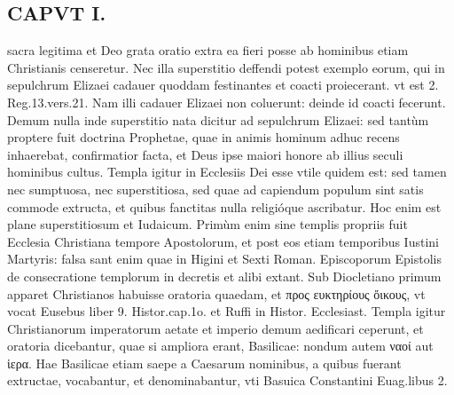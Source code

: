 \documentclass{article}
\begin{document}
\begin{pages}
\section*{CAPVT I. }
\marginpar{[ p.71 ]}\pstart sacra legitima et Deo grata oratio extra ea fieri posse ab hominibus etiam Christianis censeretur.  \pend\pstart Nec illa superstitio deffendi potest exemplo eorum, qui in sepulchrum Elizaei cadauer quoddam festinantes et coacti proiecerant. vt est 2. Reg.13.vers.21. Nam illi cadauer Elizaei non coluerunt: deinde id coacti fecerunt. Demum nulla inde superstitio nata dicitur ad sepulchrum Elizaei: sed tantùm proptere fuit doctrina Prophetae, quae in animis hominum adhuc recens inhaerebat, confirmatior facta, et Deus ipse maiori honore ab illius seculi hominibus cultus.  \pend\pstart Templa igitur in Ecclesiis Dei esse vtile quidem est: sed tamen nec sumptuosa, nec superstitiosa, sed quae ad capiendum populum sint satis commode extructa, et quibus fanctitas nulla religióque ascribatur. Hoc enim est plane superstitiosum et Iudaicum. Primùm enim sine templis propriis fuit Ecclesia Christiana tempore Apostolorum, et post eos etiam temporibus Iustini Martyris: falsa sant enim quae in Higini et Sexti Roman. Episcoporum Epistolis de consecratione templorum in decretis et alibi extant. Sub Diocletiano primum apparet Christianos habuisse oratoria quaedam, et προς ευκτηρίους  ὄικους, vt vocat Eusebus liber 9. Histor.cap.1o. et Ruffi in Histor. Ecclesiast. Templa igitur Christianorum imperatorum aetate et imperio demum aedificari ceperunt, et oratoria dicebantur, quae si ampliora erant, Basilicae: nondum autem ναοί aut ἱερα. Hae Basilicae etiam saepe a Caesarum nominibus, a quibus fuerant extructae, vocabantur, et denominabantur, vti Basuica Constantini Euag.libus 2.  \pend

\end{pages}
\end{document}
